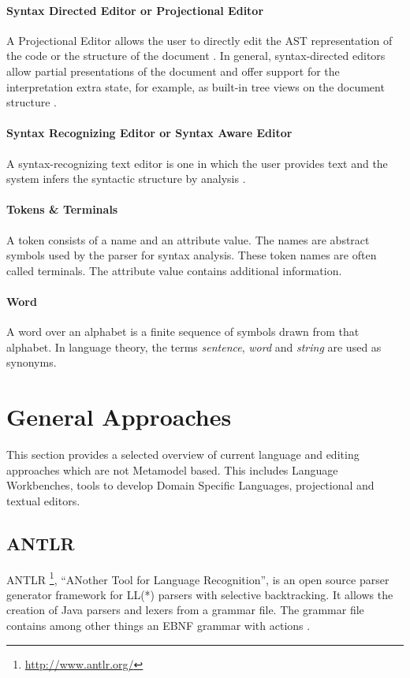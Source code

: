 \paragraph{Syntax Directed Editor or Projectional Editor} A Projectional Editor allows the user to directly edit the AST representation of the code or the structure of the document \cite{MPS}. In general, syntax-directed editors allow partial presentations of the document and offer support for the interpretation extra state, for example, as built-in tree views on the document structure \cite{proxima}.

\paragraph{Syntax Recognizing Editor or Syntax Aware Editor} A syntax-recognizing text editor is one in which the user provides text and the system infers the syntactic structure by analysis \cite{pan}. 

\paragraph{Tokens \& Terminals}  
A token consists of a name and an attribute value. The names are abstract symbols used by the parser for syntax analysis. These token names are often called terminals. The attribute value contains additional information. \cite{DragonBook}

\paragraph{Word} 
A word over an alphabet is a finite sequence of symbols drawn from that alphabet. In language theory, the terms \emph{sentence}, \emph{word} and \emph{string} are used as synonyms. \cite{DragonBook}



\section{General Approaches} \label{sec:generalApproaches}
This section provides a selected overview of current language and editing approaches which are not Metamodel based. This includes Language Workbenches, tools to develop Domain Specific Languages, projectional and textual editors.

\subsection{ANTLR}
ANTLR \footnote{\raggedright \url{http://www.antlr.org/}}, ``ANother Tool for Language Recognition'', is an open source parser generator framework for LL(*) parsers with selective backtracking. It allows the creation of Java parsers and lexers from a grammar file. The grammar file contains among other things an EBNF grammar with actions \cite{ANTLR}.

